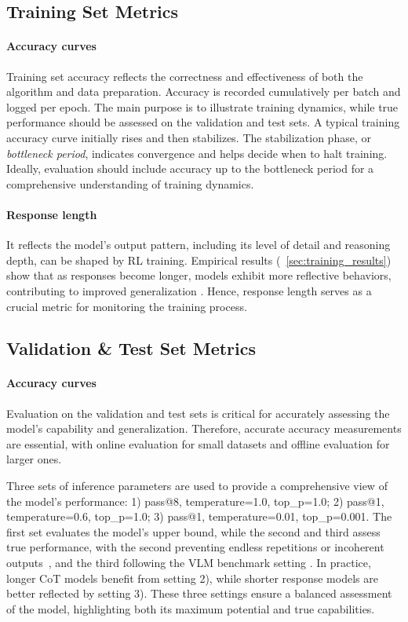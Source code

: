 \documentclass{article} %
\begin{document}
\subsection{Training Set Metrics}
\paragraph{Accuracy curves} 
%
Training set accuracy reflects the correctness and effectiveness of both the algorithm and data preparation. Accuracy is recorded cumulatively per batch and logged per epoch. The main purpose is to illustrate training dynamics, while true performance should be assessed on the validation and test sets.
%
A typical training accuracy curve initially rises and then stabilizes. The stabilization phase, or \textit{bottleneck period}, indicates convergence and helps decide when to halt training.
%
Ideally, evaluation should include accuracy up to the bottleneck period for a comprehensive understanding of training dynamics.

\paragraph{Response length}
%
It reflects the model’s output pattern, including its level of detail and reasoning depth, can be shaped by RL training. 
%
Empirical results (~\cref{sec:training_results}) show that as responses become longer, models exhibit more reflective behaviors, contributing to improved generalization \citep{chu2025RLgeneral}.
%
Hence, response length serves as a crucial metric for monitoring the training process.

\subsection{Validation \& Test Set Metrics}
%
\paragraph{Accuracy curves}
%
Evaluation on the validation and test sets is critical for accurately assessing the model's capability and generalization.
%
Therefore, accurate accuracy measurements are essential, with online evaluation for small datasets and offline evaluation for larger ones.

Three sets of inference parameters are used to provide a comprehensive view of the model's performance: 1) pass@8, temperature=1.0, top\_p=1.0; 2) pass@1, temperature=0.6, top\_p=1.0; 3) pass@1, temperature=0.01, top\_p=0.001.
%
The first set evaluates the model's upper bound, while the second and third assess true performance, with the second preventing endless repetitions or incoherent outputs~\citep{deepseek_r1}, and the third following the VLM benchmark setting \citep{bai2023Qwen-VL}.
%
In practice, longer CoT models benefit from setting 2), while shorter response models are better reflected by setting 3).
%
These three settings ensure a balanced assessment of the model, highlighting both its maximum potential and true capabilities.
%
\end{document}
